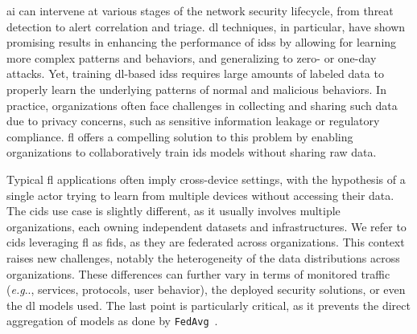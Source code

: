 \documentclass[conference]{IEEEtran}
\makeatletter
\DeclareRobustCommand\onedot{\futurelet\@let@token\@onedot}
\def\@onedot{\ifx\@topicslet@token.\else.\null\fi\xspace}
\def\eg{\emph{e.g}\onedot} \def\Eg{\emph{E.g}\onedot}
\makeatother
\begin{document}


\Gls{ai} can intervene at various stages of the network security lifecycle, from threat detection to alert correlation and triage.
\Gls{dl} techniques, in particular, have shown promising results in enhancing the performance of \glspl{ids} by allowing for learning more complex patterns and behaviors, and generalizing to zero- or one-day attacks.
Yet, training \gls{dl}-based \glspl{ids} requires large amounts of labeled data to properly learn the underlying patterns of normal and malicious behaviors.
In practice, organizations often face challenges in collecting and sharing such data due to privacy concerns, such as sensitive information leakage or regulatory compliance.
\Gls{fl} offers a compelling solution to this problem by enabling organizations to collaboratively train \gls{ids} models without sharing raw data.

Typical \gls{fl} applications often imply cross-device settings, with the hypothesis of a single actor trying to learn from multiple devices without accessing their data.
The \gls{cids} use case is slightly different, as it usually involves multiple organizations, each owning independent datasets and infrastructures.
We refer to \gls{cids} leveraging \gls{fl} as \gls{fids}, as they are federated across organizations.
%
This context raises new challenges, notably the heterogeneity of the data distributions across organizations.
These differences can further vary in terms of monitored traffic (\eg, services, protocols, user behavior), the deployed security solutions, or even the \gls{dl} models used.
The last point is particularly critical, as it prevents the direct aggregation of models as done by \texttt{FedAvg}~\cite{mcmahan_communication-efficient_2017}.
\end{document}
